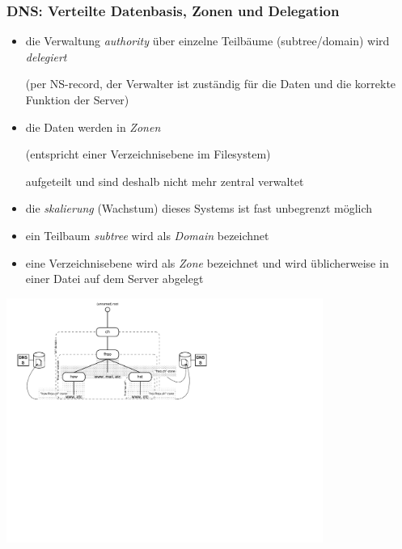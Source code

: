\documentclass[ignorenonframetext]{beamer}
\begin{document}
\begin{frame}
\frametitle{DNS: Verteilte Datenbasis, Zonen und Delegation}
\begin{itemize}
	\item{die Verwaltung {\em authority} \"uber einzelne Teilb\"aume (subtree/domain) wird {\em delegiert} \begin{tiny}(per NS-record, der Verwalter ist zust\"andig f\"ur die Daten und die korrekte Funktion der Server)\end{tiny}}
	\item{die Daten werden in {\em Zonen} \begin{tiny}(entspricht einer Verzeichnisebene im Filesystem)\end{tiny} aufgeteilt und sind deshalb nicht mehr zentral verwaltet}
	\item{die {\em skalierung} (Wachstum) dieses Systems ist fast unbegrenzt m\"oglich}
	\item{ein Teilbaum {\em subtree} wird als {\em Domain} bezeichnet}
	\item{eine Verzeichnisebene wird als {\em Zone} bezeichnet und wird \"ublicherweise in einer Datei auf dem Server abgelegt}
\end{itemize}
\begin{center}\includegraphics[height=8cm]{dns-serverhierarchy}\end{center}
\end{frame}
\end{document}
